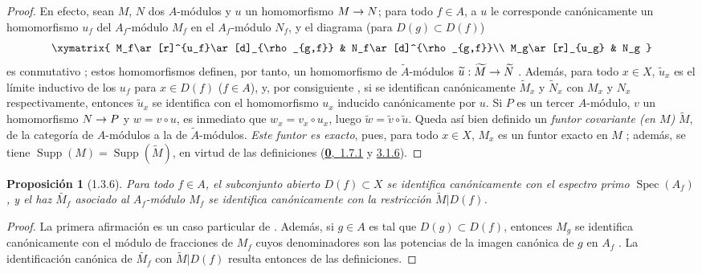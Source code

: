 \documentclass[oneside]{amsart}
\theoremstyle{ega-env-style}
\theoremstyle{ega-thm-env-style}
\newtheorem*{proposition}{Proposición}
\theoremstyle{ega-defn-env-style}
\renewcommand{\to}{\mathchoice{\longrightarrow}{\rightarrow}{\rightarrow}{\rightarrow}}
\newcommand{\oldpage}[2][]{{\marginnote{\normalfont{\textbf{#1}~|~#2}}}\ignorespaces}
\let\EGAOriginalLabel\label
\renewcommand{\label}[1]{\phantomsection\EGAOriginalLabel{#1}}
\begin{document}
\begin{proof}
En efecto, sean $M$, $N$ dos $A$-módulos y $u$ un homomorfismo $M\to N$;
para todo $f\in A$, a $u$ le corresponde canónicamente un homomorfismo $u_f$ del $A_f$-módulo $M_f$ en el $A_f$-módulo $N_f$, y el diagrama (para $D(g)\subset D(f)$)
\[
  \xymatrix{
    M_f\ar[r]^{u_f}\ar[d]_{\rho_{g,f}} & N_f\ar[d]^{\rho_{g,f}}\\
    M_g\ar[r]_{u_g} & N_g
  }
\]
es conmutativo ;
estos homomorfismos definen, por tanto, un homomorfismo de $\widetilde{A}$-módulos $\widetilde{u}:\widetilde{M}\to\widetilde{N}$ .
Además, para todo $x\in X$, $\widetilde{u}_x$ es el límite inductivo de los $u_f$ para $x\in D(f)$ ($f\in A$), y, por consiguiente , si se identifican canónicamente $\widetilde{M}_x$ y $\widetilde{N}_x$ con $M_x$ y $N_x$ respectivamente, entonces $\widetilde{u}_x$ se identifica con el homomorfismo $u_x$ inducido canónicamente por $u$.
Si $P$ es un tercer $A$-módulo, $v$ un homomorfismo $N\to P$ y $w=v\circ u$, es inmediato que $w_x=v_x\circ u_x$, luego $\widetilde{w}=\widetilde{v}\circ\widetilde{u}$.
Queda así bien definido un \emph{funtor covariante (en $M$)} $\widetilde{M}$, de la categoría de $A$-módulos a la de $\widetilde{A}$-módulos.
\emph{Este funtor es exacto}, pues, para todo $x\in X$, $M_x$ es un funtor exacto en $M$ ;
además, se tiene $\operatorname{Supp}(M)=\operatorname{Supp}(\widetilde{M})$, en virtud de las definiciones (\hyperref[0.1.7.1]{\textbf{0},~1.7.1} y \hyperref[0.3.1.6]{3.1.6}).
\end{proof}

\oldpage[I]{86}
\begin{proposition}[1.3.6]
\label{I.1.3.6}
Para todo $f\in A$, el subconjunto abierto $D(f)\subset X$ se identifica canónicamente con el espectro primo $\operatorname{Spec}(A_f)$, y el haz $\widetilde{M_f}$ asociado al $A_f$-módulo $M_f$ se identifica canónicamente con la restricción $\widetilde{M}|D(f)$.
\end{proposition}

\begin{proof}
La primera afirmación es un caso particular de .
Además, si $g\in A$ es tal que $D(g)\subset D(f)$, entonces $M_g$ se identifica canónicamente con el módulo de fracciones de $M_f$ cuyos denominadores son las potencias de la imagen canónica de $g$ en $A_f$ .
La identificación canónica de $\widetilde{M_f}$ con $\widetilde{M}|D(f)$ resulta entonces de las definiciones.
\end{proof}
\end{document}

